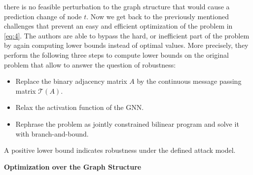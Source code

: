 \documentclass[a4paper,preprint]{sig-alternate}
\begin{document}
there is no feasible perturbation to the graph structure that would cause a prediction change of node $t$. \cite{10.1145/3394486.3403217}\newline
Now we get back to the previously mentioned challenges that prevent an easy and efficient optimization 
of the problem in \ref{eq:4}.
The authors are able to bypass the hard, or inefficient part of the problem by again computing lower bounds instead of optimal values.
More precisely, they perform the following three steps to compute lower bounds on the original problem that
allow to answer the question of robustness:
\begin{itemize}
    \item Replace the binary adjacency matrix $A$ by the continuous message passing matrix $\mathcal{T}(A)$.
    \item Relax the activation function of the GNN.
    \item Rephrase the problem as jointly constrained bilinear program and solve it with branch-and-bound.
\end{itemize}
A positive lower bound indicates robustness under the defined attack model. \cite{10.1145/3394486.3403217}\newline

\textbf{Optimization over the Graph Structure}\newline
\end{document}
